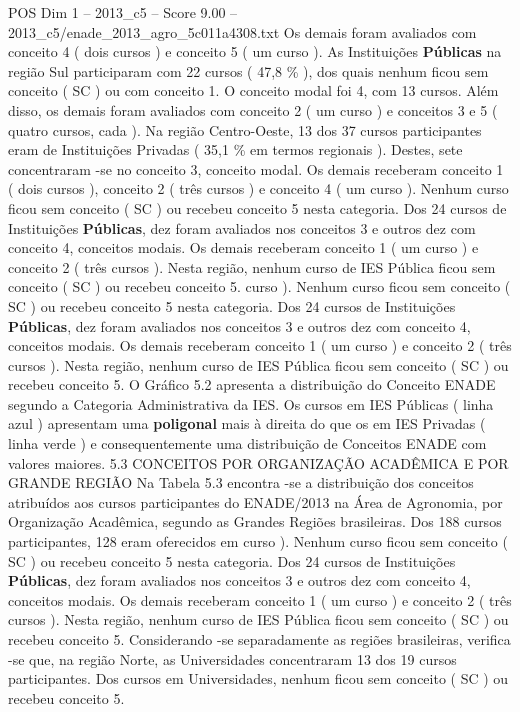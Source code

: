 \begin{textsample}{POS Dim 1 – 2013\_c5 – Score 9.00 – 2013\_c5/enade\_2013\_agro\_5c011a4308.txt}
Os demais foram avaliados com conceito 4 ( dois cursos ) e conceito 5 ( um curso ).
As Instituições \textbf{Públicas} na região Sul participaram com 22 cursos ( 47,8 \% ), dos quais nenhum ficou sem conceito ( SC ) ou com conceito 1.
O conceito modal foi 4, com 13 cursos.
Além disso, os demais foram avaliados com conceito 2 ( um curso ) e conceitos 3 e 5 ( quatro cursos, cada ).
Na região Centro-Oeste, 13 dos 37 cursos participantes eram de Instituições Privadas ( 35,1 \% em termos regionais ).
Destes, sete concentraram -se no conceito 3, conceito modal.
Os demais receberam conceito 1 ( dois cursos ), conceito 2 ( três cursos ) e conceito 4 ( um curso ).
Nenhum curso ficou sem conceito ( SC ) ou recebeu conceito 5 nesta categoria.
Dos 24 cursos de Instituições \textbf{Públicas}, dez foram avaliados nos conceitos 3 e outros dez com conceito 4, conceitos modais.
Os demais receberam conceito 1 ( um curso ) e conceito 2 ( três cursos ).
Nesta região, nenhum curso de IES Pública ficou sem conceito ( SC ) ou recebeu conceito 5. curso ).
Nenhum curso ficou sem conceito ( SC ) ou recebeu conceito 5 nesta categoria.
Dos 24 cursos de Instituições \textbf{Públicas}, dez foram avaliados nos conceitos 3 e outros dez com conceito 4, conceitos modais.
Os demais receberam conceito 1 ( um curso ) e conceito 2 ( três cursos ).
Nesta região, nenhum curso de IES Pública ficou sem conceito ( SC ) ou recebeu conceito 5.
O Gráfico 5.2 apresenta a distribuição do Conceito ENADE segundo a Categoria Administrativa da IES.
Os cursos em IES Públicas ( linha azul ) apresentam uma \textbf{poligonal} mais à direita do que os em IES Privadas ( linha verde ) e consequentemente uma distribuição de Conceitos ENADE com valores maiores. 5.3 CONCEITOS POR ORGANIZAÇÃO ACADÊMICA E POR GRANDE REGIÃO Na Tabela 5.3 encontra -se a distribuição dos conceitos atribuídos aos cursos participantes do ENADE/2013 na Área de Agronomia, por Organização Acadêmica, segundo as Grandes Regiões brasileiras.
Dos 188 cursos participantes, 128 eram oferecidos em curso ).
Nenhum curso ficou sem conceito ( SC ) ou recebeu conceito 5 nesta categoria.
Dos 24 cursos de Instituições \textbf{Públicas}, dez foram avaliados nos conceitos 3 e outros dez com conceito 4, conceitos modais.
Os demais receberam conceito 1 ( um curso ) e conceito 2 ( três cursos ).
Nesta região, nenhum curso de IES Pública ficou sem conceito ( SC ) ou recebeu conceito 5.
Considerando -se separadamente as regiões brasileiras, verifica -se que, na região Norte, as Universidades concentraram 13 dos 19 cursos participantes.
Dos cursos em Universidades, nenhum ficou sem conceito ( SC ) ou recebeu conceito 5.

\end{textsample}
